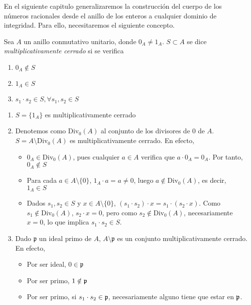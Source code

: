 \documentclass[../main.tex]{subfiles}
\begin{document}
En el siguiente capitulo generalizaremos la construcción del cuerpo de los números racionales desde el anillo de los enteros a cualquier dominio de integridad. Para ello, necesitaremos el siguiente concepto.
\begin{definition}
Sea $A$ un anillo conmutativo unitario, donde $0_A\neq 1_A$. $S\subset A$ se dice \textit{multiplicativamente cerrado} si se verifica \begin{enumerate}
    \item $0_A\notin S$
    \item $1_A\in S$
    \item $s_1\cdot s_2\in S, \forall s_1,s_2\in S$
\end{enumerate}
\end{definition}
\begin{example}
\begin{enumerate}
    \item $S=\{1_A\}$ es multiplicativamente cerrado
    \item Denotemos como $\operatorname{Div_0}(A)$ al conjunto de los divisores de $0$ de $A$. $S=A\setminus \operatorname{Div_0}(A)$ es multiplicativamente cerrado. En efecto, \begin{itemize}
        \item $0_A\in \operatorname{Div_0}(A)$, pues cualquier $a\in A$ verifica que $a\cdot 0_A=0_A$. Por tanto, $0_A\notin S$
        \item Para cada $a\in A\setminus\{0\}$, $1_A\cdot a=a\neq 0$, luego $a\notin \operatorname{Div_0}(A)$, es decir, $1_A\in S$
        \item Dados $s_1,s_2\in S$ y $x\in A\setminus\{0\}$, $(s_1\cdot s_2)\cdot x=s_1\cdot(s_2\cdot x)$. Como $s_1\notin \operatorname{Div_0}(A)$, $s_2\cdot x=0$, pero como $s_2\notin \operatorname{Div_0}(A)$, necesariamente $x=0$, lo que implica $s_1\cdot s_2\in S$.
    \end{itemize}
    \item Dado $\mathfrak{p}$ un ideal primo de $A$, $A\setminus\mathfrak{p}$ es un conjunto multiplicativamente cerrado. En efecto, \begin{itemize}
        \item Por ser ideal, $0\in\mathfrak{p}$
        \item Por ser primo, $1\notin\mathfrak{p}$
        \item Por ser primo, si $s_1\cdot s_2\in\mathfrak{p}$, necesariamente alguno tiene que estar en $\mathfrak{p}$.
    \end{itemize}
\end{enumerate}
\end{example}
\end{document}
